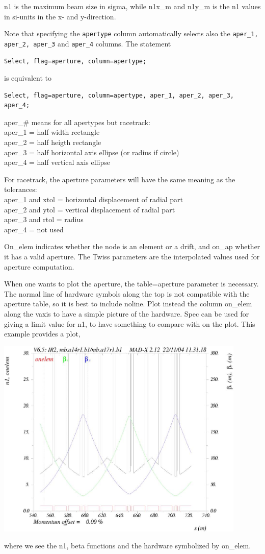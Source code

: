 n1 is the maximum beam size in sigma, while n1x\_m and n1y\_m is the n1
values in si-units in the x- and y-direction.  

Note that specifying the {\tt apertype} column automatically selects also the
{\tt aper\_1, aper\_2, aper\_3} and {\tt aper\_4} columns. The statement
\begin{verbatim}
Select, flag=aperture, column=apertype;
\end{verbatim}
is equivalent to
\begin{verbatim}
Select, flag=aperture, column=apertype, aper_1, aper_2, aper_3, aper_4;
\end{verbatim}

aper\_\# means for all apertypes but racetrack:
\\ aper\_1 = half width rectangle
\\ aper\_2 = half heigth rectangle
\\ aper\_3 = half horizontal axis ellipse (or radius if circle)
\\ aper\_4 = half vertical axis ellipse

For racetrack, the aperture parameters will have the same meaning as the
tolerances: 
\\ aper\_1 and xtol = horizontal displacement of radial part 
\\ aper\_2 and ytol = vertical displacement of radial part 
\\ aper\_3 and rtol = radius 
\\ aper\_4 = not used 

On\_elem indicates whether the node is an element or a drift, and on\_ap
whether it has a valid aperture. The Twiss parameters are the
interpolated  values used for aperture computation.  

When one wants to plot the aperture, the table=aperture parameter is
necessary. The normal line of hardware symbols along the top is not
compatible with the aperture table, so it is best to include
noline. Plot instead the column on\_elem along the vaxis to have a
simple picture of the hardware. Spec can be used for giving a limit
value for n1, to have something to compare with on the plot. This
example  provides a plot,  

\includegraphics[width=450px]{Introduction/aperexample.jpg}

where we see the n1, beta functions and the hardware symbolized by
on\_elem.     



